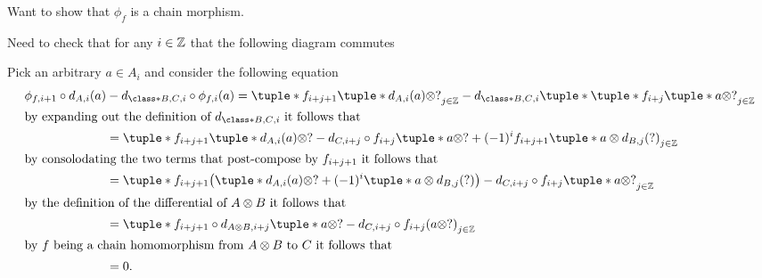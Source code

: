 \begin{remark}
    Want to show that \( \phi_f \) is a chain morphism.

    Need to check that for any \( i \in {\mathbb{Z}} \) that the following diagram commutes
    \begin{center}
    \end{center}
    Pick an arbitrary \( a \in A_i \) and consider the following equation
    \begin{align*}
        \phi_{f, i + 1} \circ d_{A, i}(a) &- d_{\class*{B, C}, i} \circ \phi_{f, i}(a)
        = \tuple*{ f_{i + j + 1}\tuple*{d_{A, i}(a) \otimes ?} }_{j \in \Zb}
        - d_{\class*{B, C}, i} \tuple*{ \tuple*{ f_{i + j}\tuple*{a \otimes ?} }_{j \in \Zb} } \\
        \intertext{by expanding out the definition of \( d_{\class*{B, C}, i} \) it follows that}
        &= \tuple*{ f_{i + j + 1}\tuple*{d_{A, i}(a) \otimes ?}
        - d_{C, i + j} \circ f_{i + j}\tuple*{a \otimes ?}
        + (-1)^i f_{i + j + 1}\tuple*{a \otimes d_{B, j}(?)} }_{j \in \Zb} \\
        \intertext{by consolodating the two terms that post-compose by \( f_{i + j + 1} \) it follows that}
        &= \tuple*{ f_{i + j + 1}\bigl( \tuple*{d_{A, i}(a) \otimes ?}
        + (-1)^i\tuple*{ a \otimes d_{B, j}(?) } \bigr)
        - d_{C, i + j} \circ f_{i + j}\tuple*{ a \otimes ? } }_{j \in \Zb} \\
        \intertext{by the definition of the differential of \( A \otimes B \) it follows that}
        &= \tuple*{ f_{i + j + 1} \circ d_{A \otimes B, i + j} \tuple*{ a \otimes ? }
        - d_{C, i + j} \circ f_{i + j} ( a \otimes ? ) }_{j \in \Zb} \\
        \intertext{by \( f \) being a chain homomorphism from \( A \otimes B \) to \( C \) it follows that}
        &= 0.
    \end{align*}
\end{remark}

